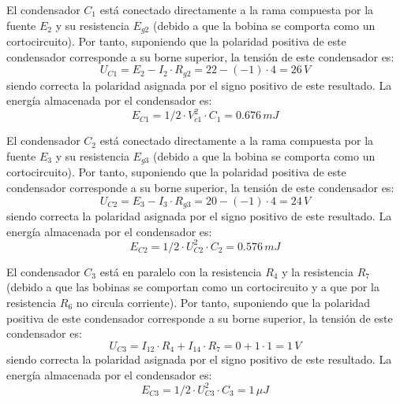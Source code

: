      El condensador $C_{1}$ está conectado directamente a la rama
     compuesta por la fuente $E_{2}$ y su resistencia $E_{g2}$ (debido
     a que la bobina se comporta como un cortocircuito). Por tanto,
     suponiendo que la polaridad positiva de este condensador
     corresponde a su borne superior, la tensión de este condensador
     es:
     \begin{equation*}
       U_{C1}=E_{2}-I_{2}\cdot R_{g2}=22-(-1)\cdot4=26\, V
     \end{equation*}
     siendo correcta la polaridad asignada por el signo positivo de
     este resultado. La energía almacenada por el condensador es:
     \begin{equation*}
       E_{C1}=1/2\cdot V_{c1}^{2}\cdot C_{1}=0.676\, mJ
     \end{equation*}

     El condensador $C_{2}$ está conectado directamente a la rama
     compuesta por la fuente $E_{3}$ y su resistencia $E_{g3}$ (debido
     a que la bobina se comporta como un cortocircuito). Por tanto,
     suponiendo que la polaridad positiva de este condensador
     corresponde a su borne superior, la tensión de este condensador
     es:
     \begin{equation*}
       U_{C2}=E_{3}-I_{3}\cdot R_{g3}=20-(-1)\cdot4=24\, V
     \end{equation*}
     siendo correcta la polaridad asignada por el signo positivo de
     este resultado. La energía almacenada por el condensador es:
     \begin{equation*}
       E_{C2}=1/2\cdot U_{C2}^{2}\cdot C_{2}=0.576\, mJ
     \end{equation*}

     El condensador $C_{3}$ está en paralelo con la resistencia
     $R_{4}$ y la resistencia $R_{7}$ (debido a que las bobinas se
     comportan como un cortocircuito y a que por la resistencia
     $R_{6}$ no circula corriente). Por tanto, suponiendo que la
     polaridad positiva de este condensador corresponde a su borne
     superior, la tensión de este condensador es:
     \begin{equation*}
       U_{C3}=I_{12}\cdot R_{4}+I_{14}\cdot R_{7}=0+1\cdot1=1\, V
     \end{equation*}
     siendo correcta la polaridad asignada por el signo positivo de
     este resultado. La energía almacenada por el condensador es:
     \begin{equation*}
       E_{C3}=1/2\cdot U_{C3}^{2}\cdot C_{3}=1\,\mu J
     \end{equation*}

